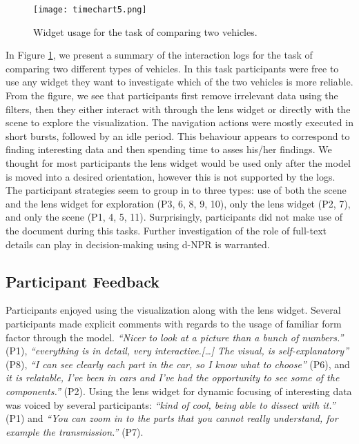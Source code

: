	\begin{figure}
	 \centering  
	 \texttt{[image: timechart5.png]}  
	 \caption{Widget usage for the task of comparing two vehicles.}
	 \label{figure:timechart}
	\end{figure}

In Figure \ref{figure:timechart}, we present a summary of the interaction logs
for the task of comparing two different types of vehicles. In this task
participants were free to use any widget they want to investigate which of the
two vehicles is more reliable. From the figure, we see that participants first
remove irrelevant data using the filters, then they either interact with through
the lens widget or directly with the \threed scene to explore the visualization.
The navigation actions were mostly executed in short bursts, followed by an idle
period. This behaviour appears to correspond to finding interesting data and
then spending time to asses his/her findings. We thought for most participants
the lens widget would be used only after the \threed model is moved into a
desired orientation, however this is not supported by the logs. The participant
strategies seem to group in to three types: use of both the \threed scene and
the lens widget for exploration (P3, 6, 8, 9, 10), only the lens widget (P2, 7),
and only the \threed scene (P1, 4, 5, 11). Surprisingly, participants did not
make use of the document during this tasks. Further investigation of the role of
full-text details can play in decision-making using d-NPR is warranted.


 
\subsection{Participant Feedback}
Participants enjoyed using the \threed visualization along with the lens widget.
Several participants made explicit comments with regards to the usage of
familiar form factor through the \threed model. \emph{``Nicer to look at a
picture than a bunch of numbers.''} (P1), \emph{``everything is in detail, very
interactive.[\ldots] The visual, is self-explanatory''} (P8), \emph{``I can see
clearly each part in the car, so I know what to choose''} (P6), and \emph{it is
relatable, I've been in cars and I've had the opportunity to see some of the
components.''} (P2). Using the lens widget for dynamic focusing of interesting
data was voiced by several participants: \emph{``kind of cool, being able to
dissect with it.''} (P1) and \emph{``You can zoom in to the parts that you
cannot really understand, for example the transmission.''} (P7).

